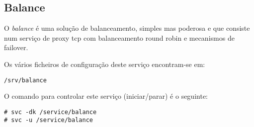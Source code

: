 \subsection{Balance}

O \emph{balance} é uma solução de balanceamento, simples mas poderosa e que consiste num serviço de proxy tcp com balanceamento round robin e mecanismos de failover.

Os vários ficheiros de configuração deste serviço encontram-se em:

\begin{Verbatim}[commandchars=\\\{\}]
/srv/balance
\end{Verbatim}

O comando para controlar este serviço (iniciar/parar) é o seguinte:

\begin{Verbatim}[commandchars=\\\{\}]
# svc -dk /service/balance
# svc -u /service/balance
\end{Verbatim}

